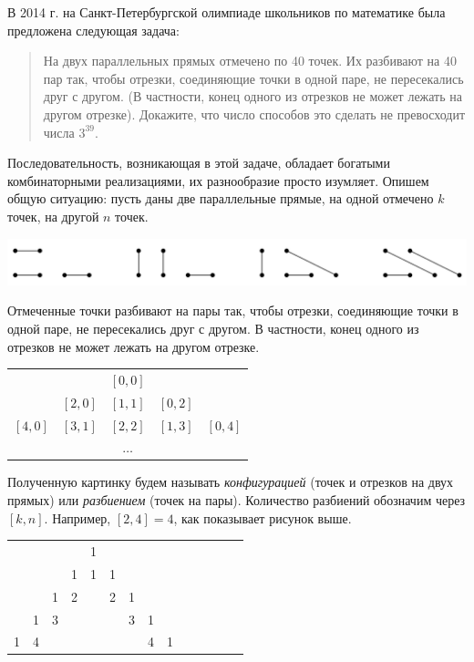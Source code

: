 \documentclass[10pt]{scrbook} \usepackage{modules/nonstahp_book}
\begin{document}
В 2014 г. на Санкт-Петербургской олимпиаде школьников по математике была предложена следующая задача:
\begin{quote}
На двух параллельных прямых отмечено по 40 точек. Их разбивают на 40 пар так, чтобы отрезки, соединяющие точки в одной паре, не пересекались друг с другом. (В частности, конец одного из отрезков не может лежать на другом отрезке). Докажите, что число способов это сделать не превосходит числа $3^{39}$.
\end{quote}
Последовательность, возникающая в этой задаче, обладает богатыми комбинаторными реализациями, их разнообразие просто изумляет. Опишем общую ситуацию: пусть даны две параллельные прямые, на одной отмечено $k$ точек, на другой $n$ точек. 
\begin{center}
\includegraphics[width=1\linewidth]{Pairs.png}%
\end{center}
Отмеченные точки разбивают на пары так, чтобы отрезки, соединяющие точки в одной паре, не пересекались друг с другом. В частности, конец одного из отрезков не может лежать на другом отрезке. 
\begin{center}
\begin{tabular}{c c c c c}
       &       &$[0,0]$&       &     \\
       &$[2,0]$&$[1,1]$&$[0,2]$&     \\
$[4,0]$&$[3,1]$&$[2,2]$&$[1,3]$&$[0,4]$ \\
       &       &$\ldots$&      &
\end{tabular}
\end{center}
Полученную картинку будем называть {\itshape конфигурацией} (точек и отрезков на двух прямых) или {\itshape разбиением} (точек на пары). Количество разбиений обозначим через $[k,n]$. Например, $[2,4] = 4$, как показывает рисунок выше.
\begin{center}
\begin{tabular}{c c c c c c c c c c c c c c}
 &  &  &  & 1&  &  &  & \\%
 &  &  & 1& 1& 1&  &  & \\ %
 &  & 1& 2&  & 2& 1&  & \\%
 & 1& 3&  &  &  & 3& 1& \\%
1& 4&  &  &  &  &  & 4& 1%
\end{tabular}
\end{center}
\end{document}
